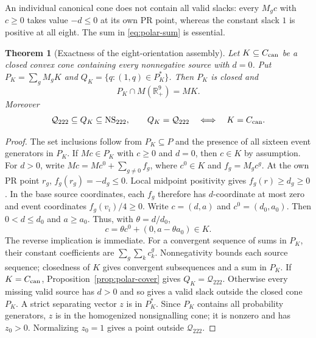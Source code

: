 \documentclass[11pt]{article}
\newtheorem{theorem}[proposition]{Theorem}
\newcommand{\R}{\mathbb R}
\begin{document}
An individual canonical cone does not contain all valid slacks: every
$M_gc$ with $c\ge0$ takes value $-d\le0$ at its own PR point,
whereas the constant slack $1$ is positive at all eight. The sum in
\eqref{eq:polar-sum} is essential.

\begin{theorem}[Exactness of the eight-orientation assembly]\label{prop:no-enlargement}
Let $K\subseteq C_{\rm can}$ be a closed convex cone containing every
nonnegative source with $d=0$. Put $P_K=\sum_gM_gK$ and
$Q_K=\{q:(1,q)\in P_K^*\}$. Then $P_K$ is closed and
\[
                         P_K\cap M(\R_+^9)=MK.
\]
Moreover
\[
 \mathcal Q_{222}\subseteq Q_K\subseteq\mathrm{NS}_{222},\qquad
 Q_K=\mathcal Q_{222}\quad\Longleftrightarrow\quad K=C_{\rm can}.
\]
\end{theorem}
\begin{proof}
The set inclusions follow from $P_K\subseteq P$ and the presence of
all sixteen event generators in $P_K$.
If $Mc\in P_K$ with $c\ge0$ and $d=0$, then $c\in K$ by assumption.
For $d>0$, write $Mc=Mc^0+\sum_{g\ne0}f_g$, where
$c^0\in K$ and $f_g=M_gc^g$.
At the own PR point $r_g$, $f_g(r_g)=-d_g\le0$. Local midpoint
positivity gives $f_g(r)\ge d_g\ge0$. In the base source coordinates,
each $f_g$ therefore has $d$-coordinate at most zero and event
coordinates $f_g(v_i)/4\ge0$. Write $c=(d,a)$ and $c^0=(d_0,a_0)$.
Then $0<d\le d_0$ and $a\ge a_0$. Thus, with $\theta=d/d_0$,
\[
               c=\theta c^0+(0,a-\theta a_0)\in K.
\]
The reverse implication is immediate.
For a convergent sequence of sums in $P_K$, their constant coefficients
are $\sum_g\sum_kc_k^g$. Nonnegativity bounds each source sequence;
closedness of $K$ gives convergent subsequences and a sum in $P_K$.
If $K=C_{\rm can}$, Proposition~\ref{prop:polar-cover} gives $Q_K=\mathcal Q_{222}$.
Otherwise every missing valid source has $d>0$ and so gives a valid
slack outside the closed cone $P_K$. A strict separating vector $z$
is in $P_K^*$. Since $P_K$ contains all probability generators,
$z$ is in the homogenized nonsignalling cone; it is nonzero and has
$z_0>0$. Normalizing $z_0=1$ gives a point outside $\mathcal Q_{222}$.
\end{proof}
\end{document}
